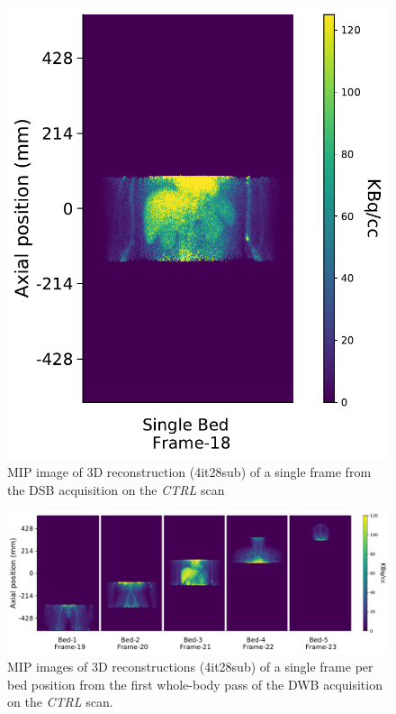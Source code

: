 \begin{figure} [h!]
\centering
\includegraphics[scale=0.52,angle=0]{3_Results/3_3_DWB_Reconstruction/figures/3_3_IsotoPK_CTRL_DSB_3D.pdf}
\caption{MIP image of 3D reconstruction (4it28sub) of a single frame from the DSB acquisition on the \textit{CTRL} scan}
\label{fig_3_3:IsotoPK_CTRL_DSB_3D}
\end{figure} 

\begin{figure} [h!]
\centering
\includegraphics[scale=0.52,angle=0]{3_Results/3_3_DWB_Reconstruction/figures/3_3_IsotoPK_CTRL_DWB_3D.pdf}
\caption{MIP images of 3D reconstructions (4it28sub) of a single frame per bed position from the first whole-body pass of the DWB acquisition on the \textit{CTRL} scan.}
\label{fig_3_3:IsotoPK_CTRL_DWB_3D}
\end{figure} 

